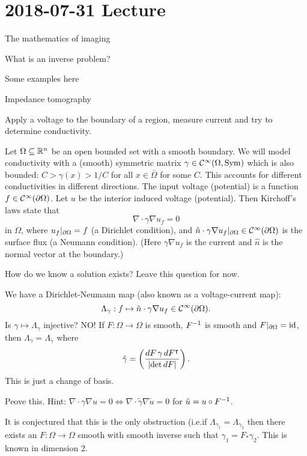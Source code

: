 \section{2018-07-31 Lecture}

The mathematics of imaging

What is an inverse problem?

Some examples here

Impedance tomography

Apply a voltage to the boundary of a region, measure current and try to determine conductivity.

Let $\Omega \subseteq \mathbb{R}^n$ be an open bounded set with a smooth boundary.
We will model conductivity with a (smooth) symmetric matrix $\gamma \in \mathcal{C}^\infty(\Omega,\operatorname{Sym})$ which is also bounded: $C > \gamma(x)> 1/C$ for all $x \in \bar\Omega$ for some $C$.
This accounts for different conductivities in different directions.
The input voltage (potential) is a function $f \in \mathcal{C}^\infty(\partial\Omega)$.
Let $u$ be the interior induced voltage (potential).
Then Kirchoff's laws state that
\[ \nabla \cdot \gamma \nabla u_f = 0 \]
in $\Omega$, where $u_f|_{\partial\Omega} = f$ (a Dirichlet condition), and $\hat n \cdot \gamma \nabla u_f|_{\partial\Omega} \in \mathcal{C}^\infty(\partial\Omega)$ is the surface flux (a Neumann condition).
(Here $\gamma\nabla u_f$ is the current and $\hat n$ is the normal vector at the boundary.)

How do we know a solution exists?
Leave this question for now.

We have a Dirichlet-Neumann map (also known as a voltage-current map):
\[ \Lambda_\gamma: f \mapsto \hat n \cdot \gamma \nabla u_f \in \mathcal{C}^\infty(\partial\Omega). \]
Is $\gamma \mapsto \Lambda_\gamma$ injective?
NO!
If $F: \Omega \to \Omega$ is smooth,  $F^{-1}$ is smooth and $F|_{\partial\Omega}=\operatorname{id}$, then $\Lambda_\gamma = \Lambda_{\tilde\gamma}$ where
\[ \tilde\gamma = \left( \frac{dF \, \gamma \, dF^\intercal}{\left\lvert \det dF \right\rvert} \right). \]
This is just a change of basis.

\begin{exer}
  Peove this.
  Hint: $\nabla \cdot \gamma \nabla u = 0 \iff \nabla \cdot \tilde \gamma \nabla \tilde u = 0$ for $\tilde u = u \circ F^{-1}$.
\end{exer}

It is conjectured that this is the only obstruction (i.e.\@ if $\Lambda_{\gamma_1}=\Lambda_{\gamma_2}$ then there exists an $F: \Omega \to \Omega$ smooth with smooth inverse such that $\gamma_1 = F_* \gamma_2$.
This is known in dimension 2.

